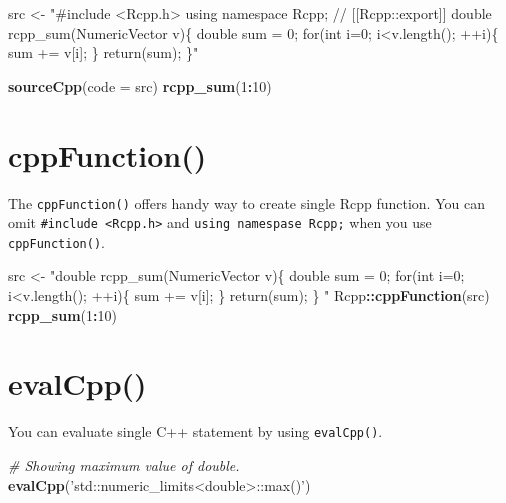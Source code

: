 \documentclass[]{book}
\newenvironment{Shaded}{\begin{snugshade}}{\end{snugshade}}
\newcommand{\KeywordTok}[1]{\textcolor[rgb]{0.13,0.29,0.53}{\textbf{#1}}}
\newcommand{\DataTypeTok}[1]{\textcolor[rgb]{0.13,0.29,0.53}{#1}}
\newcommand{\DecValTok}[1]{\textcolor[rgb]{0.00,0.00,0.81}{#1}}
\newcommand{\StringTok}[1]{\textcolor[rgb]{0.31,0.60,0.02}{#1}}
\newcommand{\CommentTok}[1]{\textcolor[rgb]{0.56,0.35,0.01}{\textit{#1}}}
\newcommand{\OperatorTok}[1]{\textcolor[rgb]{0.81,0.36,0.00}{\textbf{#1}}}
\newcommand{\NormalTok}[1]{#1}
\theoremstyle{definition}
\theoremstyle{definition}
\theoremstyle{remark}
\begin{document}
\begin{Shaded}
\begin{Highlighting}[]
\NormalTok{src <-}
\StringTok{"#include <Rcpp.h>}
\StringTok{using namespace Rcpp;}
\StringTok{// [[Rcpp::export]]}
\StringTok{double rcpp_sum(NumericVector v)\{}
\StringTok{  double sum = 0;}
\StringTok{  for(int i=0; i<v.length(); ++i)\{}
\StringTok{    sum += v[i];}
\StringTok{  \}}
\StringTok{  return(sum);}
\StringTok{\}"}

\KeywordTok{sourceCpp}\NormalTok{(}\DataTypeTok{code =}\NormalTok{ src)}
\KeywordTok{rcpp_sum}\NormalTok{(}\DecValTok{1}\OperatorTok{:}\DecValTok{10}\NormalTok{)}
\end{Highlighting}
\end{Shaded}

\section{cppFunction()}\label{cppfunction}

The \texttt{cppFunction()} offers handy way to create single Rcpp
function. You can omit
\texttt{\#include\ \textless{}Rcpp.h\textgreater{}} and
\texttt{using\ namespase\ Rcpp;} when you use \texttt{cppFunction()}.

\begin{Shaded}
\begin{Highlighting}[]
\NormalTok{src <-}
\StringTok{  "double rcpp_sum(NumericVector v)\{}
\StringTok{    double sum = 0;}
\StringTok{    for(int i=0; i<v.length(); ++i)\{}
\StringTok{      sum += v[i];}
\StringTok{    \}}
\StringTok{    return(sum);}
\StringTok{  \}}
\StringTok{  "}
\NormalTok{Rcpp}\OperatorTok{::}\KeywordTok{cppFunction}\NormalTok{(src)}
\KeywordTok{rcpp_sum}\NormalTok{(}\DecValTok{1}\OperatorTok{:}\DecValTok{10}\NormalTok{)}
\end{Highlighting}
\end{Shaded}

\section{evalCpp()}\label{evalcpp}

You can evaluate single C++ statement by using \texttt{evalCpp()}.

\begin{Shaded}
\begin{Highlighting}[]
\CommentTok{# Showing maximum value of double.}
\KeywordTok{evalCpp}\NormalTok{(}\StringTok{'std::numeric_limits<double>::max()'}\NormalTok{)}
\end{Highlighting}
\end{Shaded}
\end{document}
